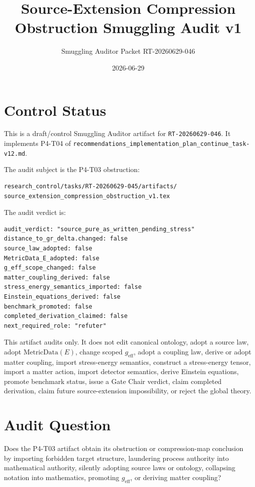 \documentclass[11pt]{article}
\title{Source-Extension Compression Obstruction Smuggling Audit v1}
\author{Smuggling Auditor Packet RT-20260629-046}
\date{2026-06-29}
\newcommand{\MetricData}{\mathrm{MetricData}}
\newcommand{\geff}{g_{\mathrm{eff}}}
\begin{document}
\maketitle

\section{Control Status}

This is a draft/control Smuggling Auditor artifact for
\texttt{RT-20260629-046}. It implements P4-T04 of
\texttt{recommendations\_implementation\_plan\_continue\_task-v12.md}.

The audit subject is the P4-T03 obstruction:

\begin{verbatim}
research_control/tasks/RT-20260629-045/artifacts/
source_extension_compression_obstruction_v1.tex
\end{verbatim}

The audit verdict is:

\begin{verbatim}
audit_verdict: "source_pure_as_written_pending_stress"
distance_to_gr_delta.changed: false
source_law_adopted: false
MetricData_E_adopted: false
g_eff_scope_changed: false
matter_coupling_derived: false
stress_energy_semantics_imported: false
Einstein_equations_derived: false
benchmark_promoted: false
completed_derivation_claimed: false
next_required_role: "refuter"
\end{verbatim}

This artifact audits only. It does not edit canonical ontology, adopt a
source law, adopt \(\MetricData(E)\), change scoped \(\geff\), adopt a
coupling law, derive or adopt matter coupling, import stress-energy semantics,
construct a stress-energy tensor, import a matter action, import detector
semantics, derive Einstein equations, promote benchmark status, issue a Gate
Chair verdict, claim completed derivation, claim future source-extension
impossibility, or reject the global theory.

\section{Audit Question}

Does the P4-T03 artifact obtain its obstruction or compression-map conclusion
by importing forbidden target structure, laundering process authority into
mathematical authority, silently adopting source laws or ontology, collapsing
notation into mathematics, promoting \(\geff\), or deriving matter coupling?
\end{document}
